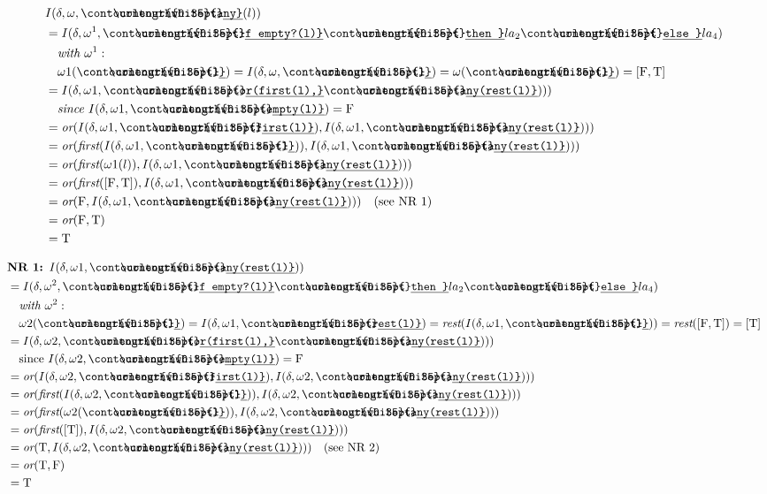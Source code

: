 \documentclass[10pt, a4paper]{article}
\newcommand{\ul}[1]{%
  \begingroup%
  \renewcommand{\ULdepth}{2.1pt}%
  \contourlength{0.35pt}%
  \uline{\phantom{#1}}\llap{\contour{white}{#1}}%
  \endgroup%
}
\newcommand{\Prog}[1]{\texttt{\ul{#1}}}
\begin{document}
\begin{align*}
\ & I(\delta, \omega, \Prog{any}(l)) \\
\ &= I(\delta, \omega^1, \Prog{if empty?(l)} \Prog{ then } la_2 \Prog{ else } la_4) \\
\ &\quad \textit{with } \omega^1: \\
\ &\quad \omega1(\Prog{l}) = I(\delta, \omega, \Prog{l}) = \omega(\Prog{l}) = [\text{F}, \text{T}] \\
\ &= I(\delta, \omega1, \Prog{or(first(l),} \Prog{any(rest(l)}))) \\
\ &\quad \textit{since } I(\delta, \omega1, \Prog{empty(l)}) = \text{F} \\
\ &= \textit{or}(I(\delta, \omega1, \Prog{first(l)}), I(\delta, \omega1, \Prog{any(rest(l)}))) \\
\ &= \textit{or}(\textit{first}(I(\delta, \omega1, \Prog{l})), I(\delta, \omega1, \Prog{any(rest(l)}))) \\
\ &= \textit{or}(\textit{first}(\omega1(l)), I(\delta, \omega1, \Prog{any(rest(l)}))) \\
\ &= \textit{or}(\textit{first}([\text{F}, \text{T}]), I(\delta, \omega1, \Prog{any(rest(l)}))) \\
\ &= \textit{or}(\text{F}, I(\delta, \omega1, \Prog{any(rest(l)}))) \quad \text{(see NR 1)} \\
\ &= \textit{or}(\text{F}, \text{T}) \\
\ &= \text{T}
\end{align*}

\begin{align*}
\ & \textbf{NR 1: } I(\delta, \omega1, \Prog{any(rest(l)}))\\
\ &= I(\delta, \omega^2, \Prog{if empty?(l)} \Prog{ then } la_2 \Prog{ else } la_4) \\
\ &\quad \textit{with } \omega^2: \\
\ &\quad \omega2(\Prog{l}) = I(\delta, \omega1, \Prog{rest(l)}) = \textit{rest}(I(\delta, \omega1, \Prog{l})) = \textit{rest}([\text{F}, \text{T}]) = [\text{T}] \\
\ &= I(\delta, \omega2, \Prog{or(first(l),} \Prog{any(rest(l)}))) \\
\ &\quad \text{since } I(\delta, \omega2, \Prog{empty(l)}) = \text{F} \\
\ &= \textit{or}(I(\delta, \omega2, \Prog{first(l)}), I(\delta, \omega2, \Prog{any(rest(l)}))) \\
\ &= \textit{or}(\textit{first}(I(\delta, \omega2, \Prog{l})), I(\delta, \omega2, \Prog{any(rest(l)}))) \\
\ &= \textit{or}(\textit{first}(\omega2(\Prog{l})), I(\delta, \omega2, \Prog{any(rest(l)}))) \\
\ &= \textit{or}(\textit{first}([\text{T}]), I(\delta, \omega2, \Prog{any(rest(l)}))) \\
\ &= \textit{or}(\text{T}, I(\delta, \omega2, \Prog{any(rest(l)}))) \quad \text{(see NR 2)} \\
\ &= \textit{or}(\text{T}, \text{F}) \\
\ &= \text{T}
\end{align*}
\end{document}
